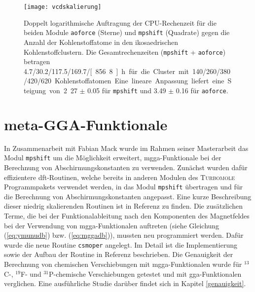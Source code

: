 \begin{figure}[ht!]
	\centering
	\texttt{[image: vcdskalierung]}
	\captionsetup{figurewithin = chapter}
	\captionsetup{font=small, labelfont=bf}\caption[Skalierung von \texttt{mpshift} und \texttt{aoforce}]{Doppelt logarithmische Auftragung der CPU-Rechenzeit für die beiden Module \texttt{aoforce} (Sterne) und \texttt{mpshift} (Quadrate) gegen die Anzahl der Kohlen\-stoff\-ato\-me in den ikosaedrischen Kohlenstoffclustern. Die Gesamtrechenzeiten (\texttt{mpshift} + \texttt{aoforce}) betragen 4.7/30.2/117.5/169.7/\unit[856.8]{h} für die Cluster mit 140/260/380/420/620 Kohlenstoffatomen. Eine lineare Anpassung liefert eine Steigung von 2.27 $\pm$ 0.05 für \texttt{mpshift} und 3.49 $\pm$ 0.16 für \texttt{aoforce}.}
\label{abb:vcdskalierung}
\end{figure}
	
\section{meta-GGA-Funktionale}\label{kap:mgga}
In Zusammenarbeit mit Fabian Mack wurde im Rahmen seiner Masterarbeit das Modul \texttt{mpshift} um die Möglichkeit erweitert, \ac{mgga}-Funktionale bei der Berechnung von Abschirmungskonstanten zu verwenden. Zunächst wurden dafür effizientere \ac{dft}-Routinen, welche bereits in anderen Modulen des \textsc{Turbomole} Programmpakets verwendet werden, in das Modul \texttt{mpshift} übertragen und für die Berechnung von Abschirmungskonstanten angepasst. Eine kurze Beschreibung dieser niedrig skalierenden Routinen ist in Referenz \cite{deglmann2002efficient} zu finden. Die zusätzlichen Terme, die bei der Funktionalableitung nach den Komponenten des Magnetfeldes bei der Verwendung von \ac{mgga}-Funktionalen auftreten (siehe Gleichung (\ref{eq:ymunudb}) bzw. (\ref{eq:mggadb})), mussten neu programmiert werden. Dafür wurde die neue Routine \texttt{csmoper} angelegt. Im Detail ist die Implementierung sowie der Aufbau der Routine in Referenz \cite{mack2017} beschrieben. Die Genauigkeit der Berechnung von chemischen Verschiebungen mit \ac{mgga}-Funktionalen wurde für $^{13}$C-, $^{19}$F- und $^{31}$P-chemische Verschiebungen getestet und mit \ac{gga}-Funktionalen verglichen.\supercite{reiter2017calculation} Eine ausführliche Studie darüber findet sich in Kapitel \ref{genauigkeit}.
\vfill
\thispagestyle{empty}
\cleardoublepage
	
	